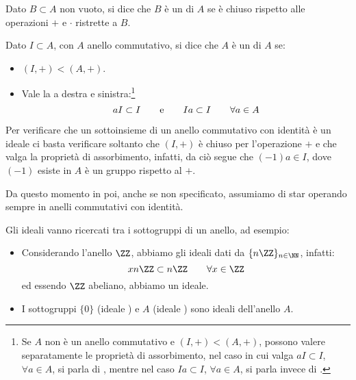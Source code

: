 \documentclass[11pt]{scrartcl}
\begin{document}
\begin{definition}
    Dato $B \subset A$ non vuoto, si dice che $B$ è un  di $A$ se è chiuso rispetto alle operazioni $+$ e $\cdot$ ristrette a $B$.
\end{definition}

\begin{definition}
    Dato $I \subset A$, con $A$ anello commutativo, si dice che $A$ è un  di $A$ se:
    \begin{itemize}
        \item $(I,+) < (A,+)$.
        \item Vale la  a destra e sinistra:\footnote{Se $A$ non è un anello commutativo e $(I,+) < (A,+)$, possono
        valere separatamente le proprietà di assorbimento, nel caso in cui valga $aI \subset I$, $\forall a \in A$, si parla di , mentre nel caso 
        $Ia \subset I$, $\forall a \in A$, si parla invece di .}
            \[ aI \subset I \qquad \text e \qquad Ia \subset I \qquad \forall a \in A
                \]
    \end{itemize}
\end{definition}

\begin{remark}
    Per verificare che un sottoinsieme di un anello commutativo con identità è un ideale ci basta verificare soltanto che $(I,+)$ è chiuso per l'operazione $+$ e che valga la proprietà di assorbimento, infatti, da ciò segue 
    che $(-1)a \in I$, dove $(-1)$ esiste in $A$ è un gruppo rispetto al $+$.
\end{remark}

Da questo momento in poi, anche se non specificato, assumiamo di star operando sempre in anelli commutativi con identità.

\begin{example}[Ideali]
    Gli ideali vanno ricercati tra i sottogruppi di un anello, ad esempio:
    \begin{itemize}
        \item Considerando l'anello $\ZZ$, abbiamo gli ideali dati da $\{n\ZZ\}_{n \in \NN}$, infatti:
            \[ xn\ZZ \subset n\ZZ \qquad \forall x \in \ZZ
                \]
        ed essendo $\ZZ$ abeliano, abbiamo un ideale.
        \item I sottogruppi $\{0\}$ (ideale ) e $A$ (ideale ) sono ideali dell'anello $A$.
    \end{itemize}
\end{example}
\end{document}
